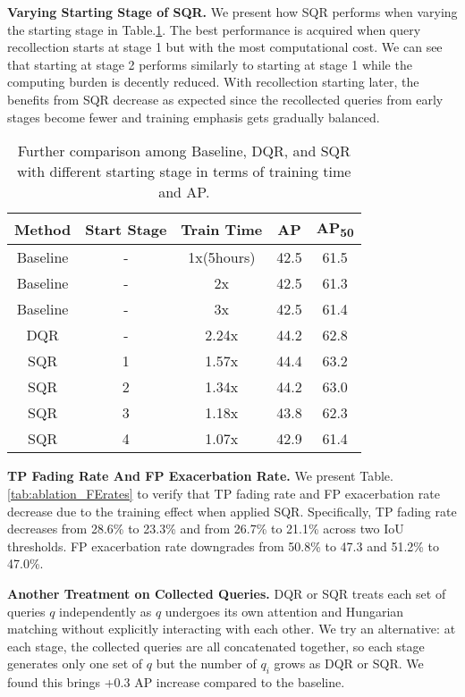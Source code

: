 \documentclass[10pt,twocolumn,letterpaper]{article}
\begin{document}
\textbf{Varying Starting Stage of SQR.} We present how SQR performs when varying the starting stage in Table.\ref{tab:startingstage}. The best performance is acquired when query recollection starts at stage 1 but with the most computational cost. We can see that starting at stage 2 performs similarly to starting at stage 1 while the computing burden is decently reduced. With recollection starting later, the benefits from SQR decrease as expected since the recollected queries from early stages become fewer and training emphasis gets gradually balanced.





\begin{table}[]
    \centering
    \begin{tabular}{c|c|c|c|c}
    \toprule[1pt]
    Method & Start Stage   & Train Time &  AP   & AP\textsubscript{50}     \\ \midrule
    Baseline &  -    &1x(5hours)&  42.5   &  61.5      \\
    Baseline &  -    &  2x   &  42.5   &  61.3      \\
    Baseline &  -    &  3x   &  42.5   &  61.4      \\
    DQR      &  -    &  2.24x&  44.2   &  62.8      \\
    SQR      &  1    &  1.57x&  44.4   &  63.2      \\
    SQR      &  2    &  1.34x&  44.2   &  63.0      \\
    SQR      &  3    &  1.18x&  43.8   &  62.3      \\
    SQR      &  4    &  1.07x&  42.9   &  61.4      \\
    \bottomrule
    \end{tabular}
    \caption{Further comparison among Baseline, DQR, and SQR with different starting stage in terms of training time and AP.}
    \label{tab:startingstage}
\end{table}

\textbf{TP Fading Rate And FP Exacerbation Rate.}
We present Table.\ref{tab:ablation_FErates} to verify that TP fading rate and FP exacerbation rate decrease due to the training effect when applied SQR. Specifically, TP fading rate decreases from 28.6\% to 23.3\% and from 26.7\% to 21.1\% across two IoU thresholds. FP exacerbation rate downgrades from 50.8\% to 47.3 and 51.2\% to 47.0\%.   

\textbf{Another Treatment on Collected Queries.} DQR or SQR treats each set of queries $q$ independently as $q$ undergoes its own attention and Hungarian matching without explicitly interacting with each other. We try an alternative: at each stage, the collected queries are all concatenated together, so each stage generates only one set of $q$ but the number of $q_i$ grows as DQR or SQR. We found this brings +0.3 AP increase compared to the baseline.
\end{document}
